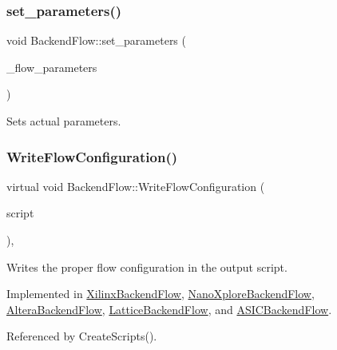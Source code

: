 \subsubsection{\texorpdfstring{set\+\_\+parameters()}{set\_parameters()}}
{\footnotesize\ttfamily void Backend\+Flow\+::set\+\_\+parameters (\begin{DoxyParamCaption}\item[{const \hyperlink{DesignParameters_8hpp_ae36bb1c4c9150d0eeecfe1f96f42d157}{Design\+Parameters\+Ref} \&}]{\+\_\+flow\+\_\+parameters }\end{DoxyParamCaption})}



Sets actual parameters. 

\mbox{\label{classBackendFlow_acd93b1846b958eb6b7e10b9894bf5615}} 
\subsubsection{\texorpdfstring{Write\+Flow\+Configuration()}{WriteFlowConfiguration()}}
{\footnotesize\ttfamily virtual void Backend\+Flow\+::\+Write\+Flow\+Configuration (\begin{DoxyParamCaption}\item[{std\+::ostream \&}]{script }\end{DoxyParamCaption})\hspace{0.3cm}{\ttfamily [protected]}, {}}



Writes the proper flow configuration in the output script. 



Implemented in \hyperlink{classXilinxBackendFlow_a0c32028a834101dcd6b6e6df5481dbe4}{Xilinx\+Backend\+Flow}, \hyperlink{classNanoXploreBackendFlow_a90dc6de670aa2eaf5b8dbc9daf7a1ba2}{Nano\+Xplore\+Backend\+Flow}, \hyperlink{classAlteraBackendFlow_a4138bec7596448fb21b796dd31e65d6f}{Altera\+Backend\+Flow}, \hyperlink{classLatticeBackendFlow_aa0695e294b18773a1ec27fe86cf16408}{Lattice\+Backend\+Flow}, and \hyperlink{classASICBackendFlow_ad296b0fd80a9e230b178d28aba056ac0}{A\+S\+I\+C\+Backend\+Flow}.



Referenced by Create\+Scripts().

